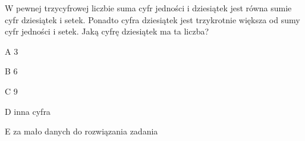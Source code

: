 \begin{tresc}
W pewnej trzycyfrowej liczbie suma cyfr jedności i dziesiątek jest równa sumie cyfr dziesiątek i setek. Ponadto cyfra dziesiątek jest trzykrotnie większa od sumy cyfr jedności i setek. Jaką cyfrę dziesiątek ma ta liczba?
\end{tresc}
\begin{wariant}{A} 3 \end{wariant}
\begin{wariant}{B} 6 \end{wariant}
\begin{wariant}{C} 9 \end{wariant}
\begin{wariant}{D} inna cyfra \end{wariant}
\begin{wariant}{E} za mało danych do rozwiązania zadania \end{wariant}

